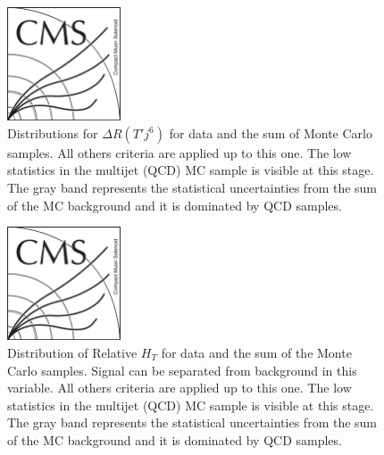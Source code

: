 \begin{figure}[!Hhtbp]
  \begin{center}
    \includegraphics[width=0.3\textwidth]{figs/CMSlogo.png}
    \caption{Distributions for $ \Delta R (T' j^{6})$  for data and the sum of Monte Carlo samples. All others criteria are applied up to this one. The low statistics in the multijet (QCD) MC sample is visible at this stage. The gray band represents the statistical uncertainties from the sum of the MC background and it is dominated by QCD samples.}
    \label{fig:jet6}
  \end{center}
\end{figure}\clearpage

\begin{figure}[!Hhtbp]
  \begin{center}
    \includegraphics[width=0.3\textwidth]{figs/CMSlogo.png}
    \caption{Distribution of Relative $H_{T}$ for data and the sum of the Monte Carlo samples. Signal can be separated from background in this variable. All others criteria are applied up to this one. The low statistics in the multijet (QCD) MC sample is visible at this stage. The gray band represents the statistical uncertainties from the sum of the MC background and it is dominated by QCD samples.}
    \label{fig:RelHtMass}
  \end{center}
\end{figure}\clearpage

